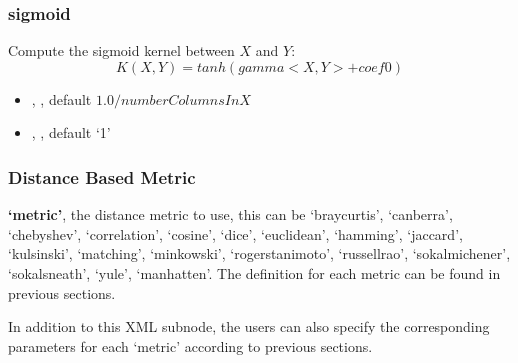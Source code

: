 \subsubsection{sigmoid}
Compute the sigmoid kernel between $X$ and $Y$:
\begin{equation}
  K(X, Y) = tanh(gamma <X, Y> + coef0)
\end{equation}
\begin{itemize}
  \item {}, , default $1.0/numberColumnsInX$
  \item {}, , default `1'
\end{itemize}

\subsubsection{Distance Based Metric}


\nb \textbf{`metric'}, the distance metric to use, this can be `braycurtis', `canberra', `chebyshev', `correlation',
`cosine', `dice', `euclidean', `hamming', `jaccard', `kulsinski', `matching', `minkowski', `rogerstanimoto',
`russellrao', `sokalmichener', `sokalsneath', `yule', `manhatten'. The definition for each metric can be found
in previous sections.

In addition to this XML subnode, the users can also specify the corresponding parameters for each `metric' according to
previous sections. 
